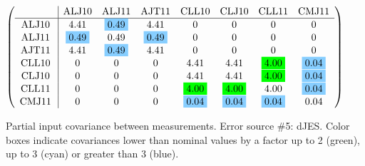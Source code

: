 \begin{table}[H]
\scriptsize
\begin{center}
\renewcommand{\arraystretch}{1.1}
\begin{math}\left(\begin{array}{c|ccccccc}
 & \mathrm{ALJ10} & 
\mathrm{ALJ11} & 
\mathrm{AJT11} & 
\mathrm{CLL10} & 
\mathrm{CLJ10} & 
\mathrm{CLL11} & 
\mathrm{CMJ11} \\
\hline
\mathrm{ALJ10} \hspace*{2pt} &       4.41 &  \colorbox{SkyBlue1}{$      0.49$} &       4.41 &  0 &  0 &  0 &  0 \\
\mathrm{ALJ11} \hspace*{2pt} &  \colorbox{SkyBlue1}{$      0.49$} &       0.49 &  \colorbox{SkyBlue1}{$      0.49$} &  0 &  0 &  0 &  0 \\
\mathrm{AJT11} \hspace*{2pt} &       4.41 &  \colorbox{SkyBlue1}{$      0.49$} &       4.41 &  0 &  0 &  0 &  0 \\
\mathrm{CLL10} \hspace*{2pt} &  0 &  0 &  0 &       4.41 &       4.41 &  \colorbox{Green1}{$      4.00$} &  \colorbox{SkyBlue1}{$      0.04$} \\
\mathrm{CLJ10} \hspace*{2pt} &  0 &  0 &  0 &       4.41 &       4.41 &  \colorbox{Green1}{$      4.00$} &  \colorbox{SkyBlue1}{$      0.04$} \\
\mathrm{CLL11} \hspace*{2pt} &  0 &  0 &  0 &  \colorbox{Green1}{$      4.00$} &  \colorbox{Green1}{$      4.00$} &       4.00 &  \colorbox{SkyBlue1}{$      0.04$} \\
\mathrm{CMJ11} \hspace*{2pt} &  0 &  0 &  0 &  \colorbox{SkyBlue1}{$      0.04$} &  \colorbox{SkyBlue1}{$      0.04$} &  \colorbox{SkyBlue1}{$      0.04$} &       0.04 \\
\end{array}\right)\end{math}
\caption{Partial input covariance between measurements. Error source \#5: dJES. Color boxes indicate covariances lower than nominal values by a factor up to 2 (green), up to 3 (cyan) or greater than 3 (blue).}
\renewcommand{\arraystretch}{1}
\end{center}
\end{table}
